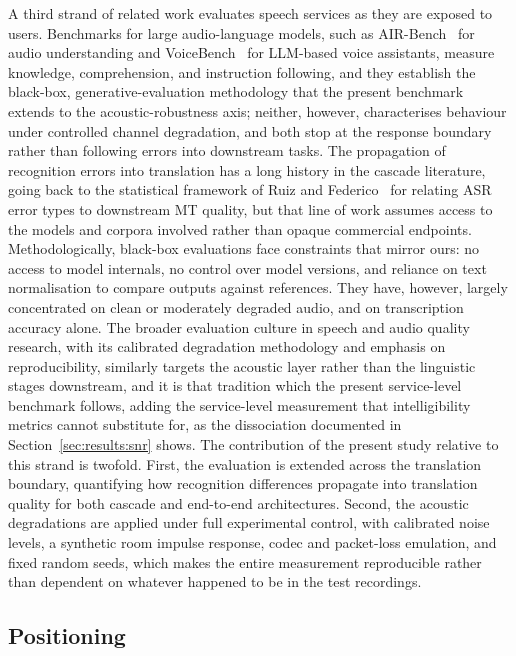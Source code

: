 A third strand of related work evaluates speech services as they are
exposed to users. Benchmarks for large audio-language models, such as
AIR-Bench~\citep{yang2024airbench} for audio understanding and
VoiceBench~\citep{chen2024voicebench} for LLM-based voice assistants,
measure knowledge, comprehension, and instruction following, and they
establish the black-box, generative-evaluation methodology that the present
benchmark extends to the acoustic-robustness axis; neither, however,
characterises behaviour under controlled channel degradation, and both stop
at the response boundary rather than following errors into downstream
tasks. The propagation of recognition errors into translation has a long
history in the cascade literature, going back to the statistical framework
of Ruiz and Federico~\citep{ruiz2014assessing} for relating ASR error types
to downstream MT quality, but that line of work assumes access to the
models and corpora involved rather than opaque commercial endpoints.
Methodologically, black-box evaluations face constraints that mirror ours:
no access to model internals, no control
over model versions, and reliance on text normalisation to compare outputs
against references. They have, however, largely concentrated on clean or
moderately degraded audio, and on transcription accuracy alone. The broader
evaluation culture in speech and audio quality research, with its
calibrated degradation methodology and emphasis on reproducibility,
similarly targets the acoustic layer rather than the linguistic stages
downstream, and it is that tradition which the present service-level
benchmark follows, adding the service-level measurement that
intelligibility metrics cannot substitute for, as the dissociation
documented in Section~\ref{sec:results:snr} shows. The
contribution of the present study relative to this strand is twofold. First,
the evaluation is extended across the translation boundary, quantifying how
recognition differences propagate into translation quality for both cascade
and end-to-end architectures. Second, the acoustic degradations are applied
under full experimental control, with calibrated noise levels, a synthetic
room impulse response, codec and packet-loss emulation, and fixed random
seeds, which makes the entire measurement reproducible rather than dependent
on whatever happened to be in the test recordings.

\subsection{Positioning}

